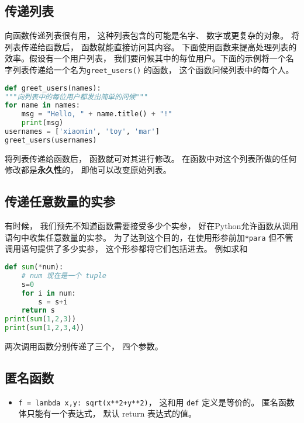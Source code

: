 \subsection{传递列表}
向函数传递列表很有用， 这种列表包含的可能是名字、 数字或更复杂的对象。 将列表传递给函数后， 函数就能直接访问其内容。 下面使用函数来提高处理列表的效率。假设有一个用户列表， 我们要问候其中的每位用户。下面的示例将一个名字列表传递给一个名为\verb|greet_users()| 的函数， 这个函数问候列表中的每个人。
\begin{lstlisting}[language=python]
def greet_users(names):
"""向列表中的每位用户都发出简单的问候"""
for name in names:
    msg = "Hello, " + name.title() + "!"
    print(msg)
usernames = ['xiaomin', 'toy', 'mar']
greet_users(usernames)
\end{lstlisting}
将列表传递给函数后， 函数就可对其进行修改。 在函数中对这个列表所做的任何修改都是\textbf{永久性}的， 即他可以改变原始列表。

\subsection{传递任意数量的实参}
有时候， 我们预先不知道函数需要接受多少个实参， 好在Python允许函数从调用语句中收集任意数量的实参。 为了达到这个目的，在使用形参前加\verb|*para| 但不管调用语句提供了多少实参， 这个形参都将它们包括进去。 例如求和
\begin{lstlisting}[language=python]
def sum(*num):
    # num 现在是一个 tuple
    s=0
    for i in num:
        s = s+i
    return s
print(sum(1,2,3))
print(sum(1,2,3,4))
\end{lstlisting}
两次调用函数分别传递了三个， 四个参数。

\subsection{匿名函数}
\begin{itemize}
\item \verb|f = lambda x,y: sqrt(x**2+y**2)|， 这和用 \verb|def| 定义是等价的。 匿名函数体只能有一个表达式， 默认 return 表达式的值。
\end{itemize}
